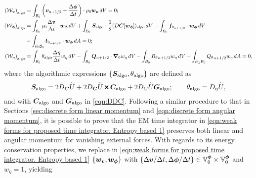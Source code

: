 \begin{equation}\label{eqn:weak forms for proposed time integrator. Entropy based 1}
\begin{aligned}
\left(\mathcal{W}_{\vect{v}}\right)_{\text{algo}}&=\int_{\mathcal{B}_0}\left(\vect{v}_{n+1/2} - \frac{\Delta\vect{\phi}}{\Delta t}\right)\cdot\rho_0\vect{w}_{\vect{v}}\,dV = 0;\\
%
\left(\mathcal{W}_{\vect{\phi}}\right)_{\text{algo}}&=\int_{\mathcal{B}_0}\rho_0\frac{\Delta\vect{v}}{\Delta t}\cdot\vect{w}_{\vect{\phi}}\,dV + \int_{\mathcal{B}_0}\vect{S}_{\text{algo}}:\frac{1}{2}(D\vect{C}[\vect{w}_{\vect{\phi}}])_{\text{algo}}\,dV-  \int_{\mathcal{B}_0}\vect{f}_{0_{n+1/2}}\cdot\vect{w}_{\vect{\phi}}\,dV\\&-
\int_{\partial_{\boldsymbol{t}}\mathcal{B}_0}\vect{t}_{0_{n+1/2}}\cdot\vect{w}_{\vect{\phi}}\,dA = 0;\\
%
\left(\mathcal{W}_{\eta}\right)_{\text{algo}}&=   \int_{\mathcal{B}_0}\theta_{\text{algo}}\frac{\Delta \eta}{\Delta t}w_{\eta}\,dV - \int_{\mathcal{B}_0}\vect{Q}_{n+1/2}\cdot\vect{\nabla}_0w_{\eta}\,dV - \int_{\mathcal{B}_0}{R_{\theta}}_{n+1/2}w_{\eta}\,dV - \int_{\partial_{Q}\mathcal{B}_{0}}{Q_{\theta}}_{n+1/2}w_{\eta}\,dA = 0,
%
\end{aligned}
\end{equation}
%
where the algorithmic expressions $\{\boldsymbol{S}_{\text{algo}},\theta_{\text{algo}}\}$ are defined as
%
\begin{equation}\label{eqn:approximated expression for DWdeltavarphi entropy-based}
\begin{aligned}
\vect{S}_{\text{algo}} = 2D_{\vect{C}}\widetilde{U} + 2D_{\vect{G}}\widetilde{U}\Cross\vect{C}_{\text{algo}} + 2D_{C}\widetilde{U}\vect{G}_{\text{algo}};\qquad
%
\theta_{\text{algo}}=D_{\eta}\widetilde{U},
%
\end{aligned}
\end{equation}
%
and with $\boldsymbol{C}_{\text{algo}}$ and $\boldsymbol{G}_{\text{algo}}$ in \eqref{eqn:DDC}.
Following  a similar procedure to that in Sections \ref{sec:discrete form linear momentum} and \ref{eqn:discrete form angular momentum}, it is possible to prove that the EM time integrator in \eqref{eqn:weak forms for proposed time integrator. Entropy based 1} preserves both linear and angular momentum for vanishing external forces. With regards to its energy conservation properties,  we replace in \eqref{eqn:weak forms for proposed time integrator. Entropy based 1}  $\{\boldsymbol{w}_{\boldsymbol{v}},\boldsymbol{w}_{\boldsymbol{\phi}}\}$  with $\{\Delta{\boldsymbol{v}}/\Delta t,{\Delta{\boldsymbol{\phi}}}/\Delta t\}\in\mathbb{V}_0^{\boldsymbol{\phi}}\times\mathbb{V}_0^{\boldsymbol{\phi}}$ and $w_{\eta}=1$, yielding
